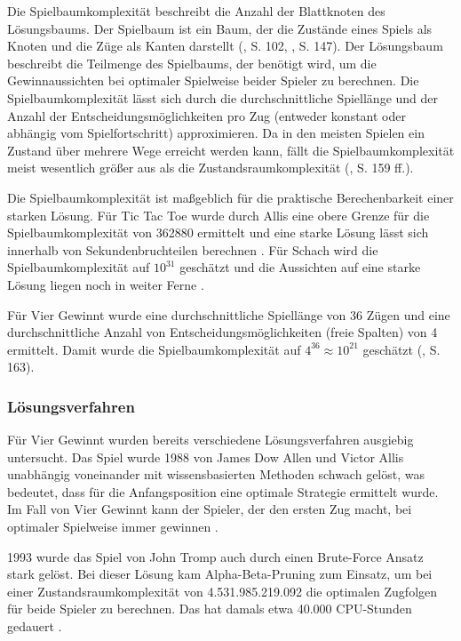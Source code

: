 Die Spielbaumkomplexität beschreibt die Anzahl der Blattknoten des Lösungsbaums. Der Spielbaum ist ein Baum, der die Zustände eines Spiels als Knoten und die Züge als Kanten darstellt (\cite{Bewersdorff.2018}, S. 102, \cite{Russell.2020}, S. 147). Der Lösungsbaum beschreibt die Teilmenge des Spielbaums, der benötigt wird, um die Gewinnaussichten bei optimaler Spielweise beider Spieler zu berechnen. Die Spielbaumkomplexität lässt sich durch die durchschnittliche Spiellänge und der Anzahl der Entscheidungsmöglichkeiten pro Zug (entweder konstant oder abhängig vom Spielfortschritt) approximieren. Da in den meisten Spielen ein Zustand über mehrere Wege erreicht werden kann, fällt die Spielbaumkomplexität meist wesentlich größer aus als die Zustandsraumkomplexität (\cite{Allis.1994}, S. 159 ff.).

Die Spielbaumkomplexität ist maßgeblich für die praktische Berechenbarkeit einer starken Lösung. Für Tic Tac Toe wurde durch Allis eine obere Grenze für die Spielbaumkomplexität von 362880 ermittelt und eine starke Lösung lässt sich innerhalb von Sekundenbruchteilen berechnen \cite{Paul.2009}. Für Schach wird die Spielbaumkomplexität auf $10^{31}$ geschätzt und die Aussichten auf eine starke Lösung liegen noch in weiter Ferne \cite{Schaeffer.2007}.

Für Vier Gewinnt wurde eine durchschnittliche Spiellänge von 36 Zügen und eine durchschnittliche Anzahl von Entscheidungsmöglichkeiten (freie Spalten) von 4 ermittelt. Damit wurde die Spielbaumkomplexität auf $4^{36} \approx 10^{21}$ geschätzt (\cite{Allis.1994}, S. 163).

\subsubsection{Lösungsverfahren}

Für Vier Gewinnt wurden bereits verschiedene Lösungsverfahren ausgiebig untersucht. Das Spiel wurde 1988 von James Dow Allen und Victor Allis unabhängig voneinander mit wissensbasierten Methoden schwach gelöst, was bedeutet, dass für die Anfangsposition eine optimale Strategie ermittelt wurde. Im Fall von Vier Gewinnt kann der Spieler, der den ersten Zug macht, bei optimaler Spielweise immer gewinnen \cite{Allen.2010}\cite{Allis.1988}.

1993 wurde das Spiel von John Tromp auch durch einen Brute-Force Ansatz stark gelöst. Bei dieser Lösung kam Alpha-Beta-Pruning zum Einsatz, um bei einer Zustandsraumkomplexität von 4.531.985.219.092 die optimalen Zugfolgen für beide Spieler zu berechnen. Das hat damals etwa 40.000 CPU-Stunden gedauert \cite{Tromp}.

